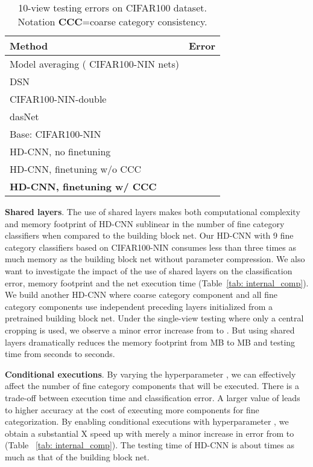 \documentclass[10pt,twocolumn,letterpaper]{article}
\begin{document}
{\renewcommand{\arraystretch}{1.2}\begin{table}[t]
\caption{10-view testing errors on CIFAR100 dataset. Notation \textbf{CCC}=coarse category consistency. }
\label{tab: cifar_results} 
\vspace{-2em}
\begin{center}
    \begin{tabular}{ p{6.4cm} | p{1.1cm}}
    Method & Error \\ 
    \hline \hline
Model averaging ( CIFAR100-NIN nets) &   \\ \hline    
    DSN ~\cite{lee2014deeply}  &   \\ \hline
    CIFAR100-NIN-double &  \\ \hline    
    dasNet~\cite{stollenga2014deep} &    \\ \hline
    \hline
    Base: CIFAR100-NIN &  \\ \hline
    HD-CNN, no finetuning &   \\ \hline
    HD-CNN, finetuning w/o CCC &   \\ \hline
    \textbf{HD-CNN, finetuning w/ CCC} &   \\ \hline
    \end{tabular}   
\end{center}
\vspace{-1em}
\end{table}
}

\noindent \textbf{Shared layers}. The use of shared layers makes both computational complexity and memory footprint of HD-CNN sublinear in the number of fine category classifiers when compared to the building block net.  Our HD-CNN with 9 fine category classifiers based on CIFAR100-NIN consumes less than three times as much memory as the building block net without parameter compression. We also want to investigate the impact of the use of shared layers on the classification error, memory footprint and the net execution time (Table~\ref{tab: internal_comp}). We build  another HD-CNN where coarse category component and all fine category components use independent preceding layers initialized from a pretrained building block net. Under the single-view testing where only a central cropping is used, we observe a minor error increase from  to . But using shared layers dramatically reduces the memory footprint from  MB to  MB and testing time from  seconds to  seconds.

\noindent \textbf{Conditional executions}. By varying the hyperparameter , we can effectively affect the number of fine category components that will be executed. There is a trade-off between execution time and classification error. A larger value of  leads to higher accuracy at the cost of executing more components for fine categorization. By enabling conditional executions with hyperparameter , we obtain a substantial X speed up with merely a minor increase in error from  to  (Table ~\ref{tab: internal_comp}). The testing time of HD-CNN is about  times as much as that of the building block net.
\end{document}
